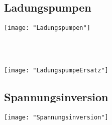 \subsection{Ladungspumpen}
\begin{minipage}[t]{0.3\textwidth}
	\vspace{0pt}								%
	\texttt{[image: "Ladungspumpen"]}
\end{minipage}\hspace{0.05\textwidth}
\begin{minipage}[t]{0.3\textwidth}
	\vspace{0pt}
	\\
	\\
\end{minipage}
\begin{minipage}[t]{0.3\textwidth}
	\vspace{0pt}
	\texttt{[image: "LadungspumpeErsatz"]}
\end{minipage}
\vspace{2mm}


\subsection{Spannungsinversion}
\begin{minipage}[t]{0.3\textwidth}
	\vspace{0pt}								%
	\texttt{[image: "Spannungsinversion"]}
\end{minipage}\hspace{0.05\textwidth}
\begin{minipage}[t]{0.3\textwidth}
	\vspace{0pt}
	
\end{minipage}
\begin{minipage}[t]{0.3\textwidth}
	\vspace{0pt}
	
\end{minipage}
\vspace{2mm}

